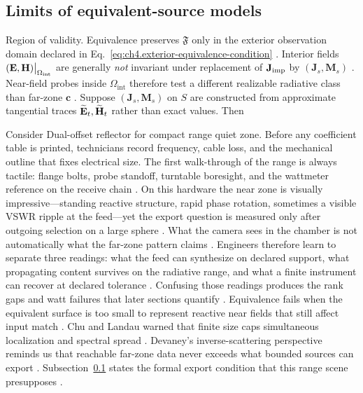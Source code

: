 \subsection{Limits of equivalent-source models}
\label{sec:ch424}
Region of validity. Equivalence preserves \(\mathfrak{F}\) only in the exterior observation domain declared in
Eq.~\eqref{eq:ch4.exterior-equivalence-condition} \cite{stratton1941}. Interior fields
\((\mathbf{E},\mathbf{H})\big|_{\Omega_{\mathrm{int}}}\) are generally \emph{not} invariant under replacement of \(\mathbf{J}_{\mathrm{imp}}\) by
\((\mathbf{J}_{s},\mathbf{M}_{s})\) \cite{harrington2001}. Near-field probes inside
\(\Omega_{\mathrm{int}}\) therefore test a different realizable radiative class than far-zone \(\mathbf{c}\)
\cite{devaney2004}.
\label{thm:ch4.equivalence-error}
Suppose \((\mathbf{J}_{s},\mathbf{M}_{s})\) on \(S\) are constructed from approximate tangential traces
\(\widetilde{\mathbf{E}}_{t},\widetilde{\mathbf{H}}_{t}\) rather than exact values. Then
\begin{physicalvignette}
Consider Dual-offset reflector for compact range quiet zone. Before any coefficient table is printed, technicians record frequency, cable loss, and the mechanical outline that fixes electrical size. The first walk-through of the range is always tactile: flange bolts, probe standoff, turntable boresight, and the wattmeter reference on the receive chain \cite{hansen1988}.
On this hardware the near zone is visually impressive---standing reactive structure, rapid phase rotation, sometimes a visible VSWR ripple at the feed---yet the export question is measured only after outgoing selection on a large sphere \cite{harrington2001}. What the camera sees in the chamber is not automatically what the far-zone pattern claims \cite{stratton1941}.
Engineers therefore learn to separate three readings: what the feed can synthesize on declared support, what propagating content survives on the radiative range, and what a finite instrument can recover at declared tolerance \cite{devaney2004}. Confusing those readings produces the rank gaps and watt failures that later sections quantify \cite{pal2026}.
Equivalence fails when the equivalent surface is too small to represent reactive near fields that still affect input match . 
Chu and Landau warned that finite size caps simultaneous localization and spectral spread \cite{chu1948}. Devaney's inverse-scattering perspective reminds us that reachable far-zone data never exceeds what bounded sources can export \cite{devaney2004}.
Subsection~\ref{sec:ch424} states the formal export condition that this range scene presupposes \cite{stratton1941}.
\end{physicalvignette}
